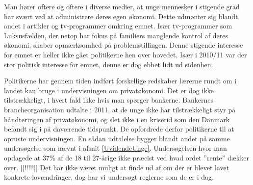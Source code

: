 Man hører oftere og oftere i diverse medier, at unge mennesker i stigende grad har svært ved at administrere deres egen økonomi. Dette udmønter sig blandt andet i artikler og tv-programmer omkring emnet. Især tv-programmer som Luksusfælden, der netop har fokus på familiers manglende kontrol af deres økonomi, skaber opmærksomhed på problemstillingen. Denne stigende interesse for emnet er heller ikke gået politikerne hen over hovedet. Især i 2010/11 var der stor politisk interesse for emnet, denne er dog ebbet lidt ud sidenhen.

Politikerne har gennem tiden indført forskellige redskaber lærerne rundt om i landet kan bruge i undervisningen om privatøkonomi. Det er dog ikke tilstrækkeligt, i hvert fald ikke hvis man spørger bankerne. Bankernes brancheorganisation udtalte i 2011, at de unge ikke har tilstrækkeligt styr på håndteringen af privatøkonomi, og slet ikke i en krisetid som den Danmark befandt sig i på daværende tidspunkt. De opfordrede derfor politikerne til at opruste undervisningen. En sådan udtalelse bygger blandt andet på samme  undersøgelse som nævnt i afsnit \ref{UvidendeUnge}. Undersøgelsen hvor man opdagede at 37\% af de 18 til 27-årige ikke præcist ved hvad ordet ”rente” dækker over. [[!!!!!]] Det har ikke været muligt at finde ud af om der er blevet lavet konkrete lovændringer, dog har vi undersøgt reglerne som de er i dag. 

